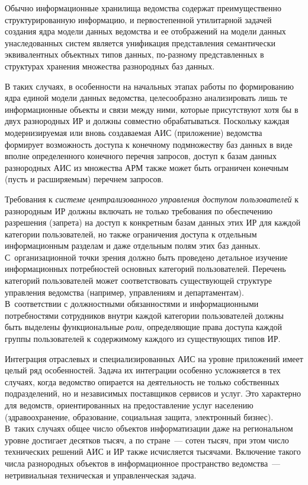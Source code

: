 \begin{multicols}{2}
      Обычно информационные хранилища ведомства содержат преимущественно 
структурированную информацию, и первостепенной утилитарной задачей создания ядра 
модели данных ведомства и ее отображений на модели данных унаследованных систем 
является унификация представления семантически эквивалентных объектных типов данных, 
по-разному представленных в структурах хранения множества разнородных баз данных. 

      
      В таких случаях, в особенности на начальных этапах работы по формированию ядра 
единой модели данных ведомства, целесообразно анализировать лишь те информационные 
объекты и связи между ними, которые присутствуют хотя бы в двух разнородных ИР и 
должны совместно обрабатываться. Поскольку каждая модернизируемая или вновь 
создаваемая АИС (приложение) ведомства формирует возможность доступа к конечному 
подмножеству баз данных в виде вполне определенного конечного перечня запросов, доступ к 
базам данных разнородных АИС из множества АРМ также может быть ограничен конечным 
(пусть и расширяемым) перечнем запросов. 
      
      Требования к \textit{системе централизованного управ\-ле\-ния доступом пользователей} 
к разнородным ИР должны включать не только требования по обеспечению разрешения 
(запрета) на доступ к конкретным базам данных этих ИР для каждой категории пользователей, 
но также ограничения доступа к отдельным информационным разделам и даже отдельным 
полям этих баз данных. С~организационной точки зрения должно быть проведено детальное 
изучение информационных потреб\-ностей\linebreak
основных категорий пользователей. Перечень 
категорий пользователей может соответствовать су\-щест\-ву\-ющей структуре управления 
ведомства\linebreak 
(например, управлениям и департаментам). В~соответствии с должностными 
обязанностями и информационными потребностями сотрудников внутри каж\-дой категории 
пользователей должны быть выделены функциональные \textit{роли}, определяющие права 
доступа каждой группы пользователей к содержимому каждого из существующих типов 
ИР.

      
      Интеграция отраслевых и специализированных АИС на уровне приложений имеет 
целый ряд особенностей. Задача их интеграции особенно усложняется в тех случаях, когда 
ведомство опирается на деятельность не только собственных подразделений, но и 
независимых поставщиков сервисов и услуг. Это характерно для ведомств, ориентированных 
на предоставление услуг населению (здравоохранение, образование, социальная защита, 
электронный бизнес). В~таких случаях общее число объектов информатизации даже на 
региональном уровне достигает десятков тысяч, а по стране~--- сотен тысяч, при этом число 
технических решений\linebreak
АИС и ИР также исчисляется тысячами. Включение такого числа 
разнородных объектов в информационное пространство ведомства~--- нетривиальная 
техническая и управленческая задача.



\end{multicols}
